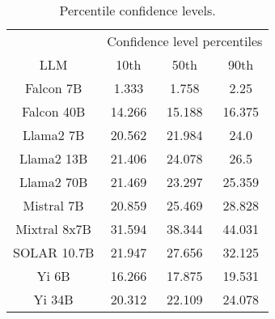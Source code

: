 \begin{table*}
\centering
\begin{tabular}{c|c|c|c}
& \multicolumn{3}{c}{Confidence level percentiles} \\ 
LLM & 10th & 50th & 90th\\ \hline
Falcon 7B & 1.333 & 1.758 & 2.25\\
Falcon 40B & 14.266 & 15.188 & 16.375\\
Llama2 7B & 20.562 & 21.984 & 24.0\\
Llama2 13B & 21.406 & 24.078 & 26.5\\
Llama2 70B & 21.469 & 23.297 & 25.359\\
Mistral 7B & 20.859 & 25.469 & 28.828\\
Mixtral 8x7B & 31.594 & 38.344 & 44.031\\
SOLAR 10.7B & 21.947 & 27.656 & 32.125\\
Yi 6B & 16.266 & 17.875 & 19.531\\
Yi 34B & 20.312 & 22.109 & 24.078\\
\hline
\end{tabular}
\caption{Percentile confidence levels.}
\label{tab:percentile_conf}
\end{table*}
